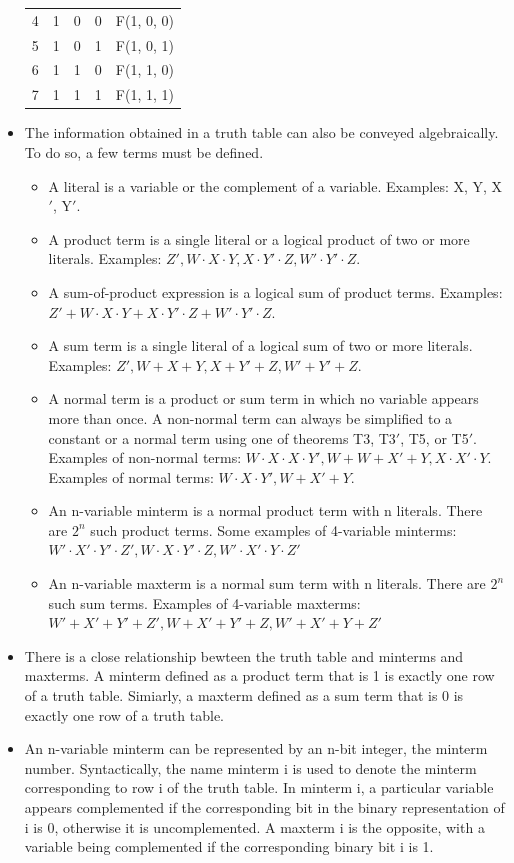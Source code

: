 \documentclass[10pt,a4paper]{article}
\begin{document}
\begin{itemize}
\begin{tabular}{|ccccc|}
4 & 1 & 0 & 0 & F(1, 0, 0) \\ 
5 & 1 & 0 & 1 & F(1, 0, 1) \\ 
6 & 1 & 1 & 0 & F(1, 1, 0) \\ 
7 & 1 & 1 & 1 & F(1, 1, 1) \\ 
\hline 
\end{tabular} 
\item The information obtained in a truth table can also be conveyed algebraically. To do so, a few terms must be defined.
\begin{itemize}
\item A literal is a variable or the complement of a variable. Examples: X, Y, X$'$, Y$'$. 
\item A product term is a single literal or a logical product of two or more literals. Examples: $Z', W\cdot X\cdot Y, X\cdot Y'\cdot Z, W'\cdot Y'\cdot Z$.
\item A sum-of-product expression is a logical sum of product terms. Examples: $Z'+W\cdot X\cdot Y+X\cdot Y'\cdot Z+W'\cdot Y'\cdot Z$.
\item A sum term is a single literal of a logical sum of two or more literals. Examples: $Z', W+X+Y, X+Y'+Z, W'+Y'+Z$.
\item A normal term is a product or sum term in which no variable appears more than once. A non-normal term can always be simplified to a constant or a normal term using one of theorems T3, T3$'$, T5, or T5$'$. Examples of non-normal terms: $W\cdot X\cdot X\cdot Y', W+W+X'+Y, X\cdot X'\cdot Y$. Examples of normal terms: $W\cdot X\cdot Y', W+X'+Y$.
\item An n-variable minterm is a normal product term with n literals. There are $2^n$ such product terms. Some examples of 4-variable minterms: $W'\cdot X'\cdot Y'\cdot Z', W\cdot X\cdot Y'\cdot Z, W'\cdot X'\cdot Y\cdot Z'$
\item An n-variable maxterm is a normal sum term with n literals. There are $2^n$ such sum terms. Examples of 4-variable maxterms: $W'+X'+Y'+Z', W+X'+Y'+Z, W'+X'+Y+Z'$
\end{itemize}
\item There is a close relationship bewteen the truth table and minterms and maxterms. A minterm defined as a product term that is 1 is exactly one row of a truth table. Simiarly, a maxterm defined as a sum term that is 0 is exactly one row of a truth table. 
\item An n-variable minterm can be represented by an n-bit integer, the minterm number. Syntactically, the name minterm i is used to denote the minterm corresponding to row i of the truth table. In minterm i, a particular variable appears complemented if the corresponding bit in the binary representation of i is 0, otherwise it is uncomplemented. A maxterm i is the opposite, with a variable being complemented if the corresponding binary bit i is 1. 

\end{itemize}
\end{document}

